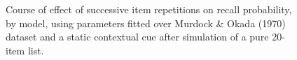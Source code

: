 \documentclass[
  letterpaper,
  DIV=11]{article}
\begin{document}
\begin{figure}

%

\caption{\label{fig-repeffect}Course of effect of successive item
repetitions on recall probability, by model, using parameters fitted
over Murdock \& Okada (1970) dataset and a static contextual cue after
simulation of a pure 20-item list.}

\end{figure}
\end{document}
